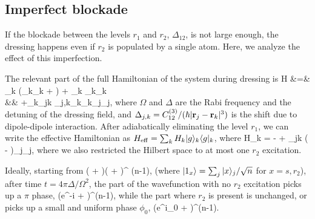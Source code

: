 \subsection{Imperfect blockade}
\label{sec:imperfect_blockade}
If the blockade between the levels $r_1$ and $r_2$, $\Delta_{12}$, is not large
enough, the dressing happens even if $r_2$ is populated by a single
atom. Here, we analyze the effect of this imperfection.

The relevant part of the full Hamiltonian of the system during dressing is
\bal
	H &=& \sum_k \left(_k_k + \right)
	+ \Delta\sum_k _k_k \\
	&& +\sum_k\sum_{j\neq k}
	\Delta_{j,k}_k_k_j_j,
\eal
where $\Omega$ and $\Delta$ are the Rabi frequency and the detuning of the
dressing field, and $\Delta_{j,k} = C_{12}^{(3)}/(\hbar |{\mathbf r}_j - {\mathbf r}_k|^3)$ is
the shift due to dipole-dipole interaction. 
After adiabatically eliminating the level $r_1$, we can write the effective
Hamiltonian as $H_\mathrm{eff} = \sum_k H_k | g \rangle_k\langle g |_k$, where
\bel
	H_k = - + \sum_{j\neq k}
	\left( - \right)_j_j,
\eel
where we also restricted the Hilbert space to at most one $r_2$ excitation.

Ideally, starting from 
\bel
	\Big( + \Big)\Big( + \Big)^{\otimes
	(n-1)},
\eel
(where $| 1_x \rangle = \sum_j| x \rangle_j/\sqrt{n}$ for $x=s,r_2$),
after time $t = 4\pi\Delta/\Omega^2$, the part
of the wavefunction with no $r_2$ excitation picks up a $\pi$ phase, 
\bel
	\Big(e^{-i\pi} + \Big)^{\otimes (n-1)},
\eel
while the part
where $r_2$ is present is unchanged, or
picks up a small and uniform phase $\phi_0$,
\bel
	\Big(e^{i\phi_0} + \Big)^{\otimes (n-1)}.
\eel

